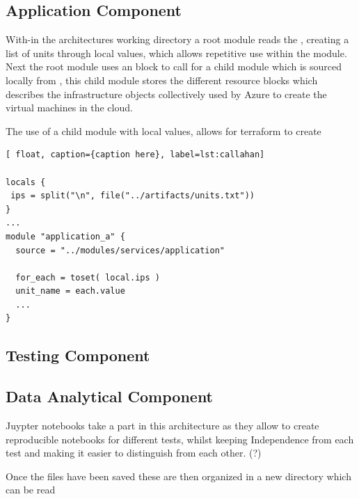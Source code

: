\subsection{Application Component}
With-in the architectures working directory a root module  reads the , creating a list of units through local values, which allows repetitive use within the module. Next the root module uses an  block to call for a child module which is sourced locally from , this child module stores the different resource blocks which describes the infrastructure objects collectively used by Azure to create the virtual machines in the cloud. 

The use of a child module with local values, allows for terraform to create 

\begin{lstlisting}[ float, caption={caption here}, label=lst:callahan]
  
locals {
 ips = split("\n", file("../artifacts/units.txt"))
}
...
module "application_a" {
  source = "../modules/services/application"

  for_each = toset( local.ips )
  unit_name = each.value
  ...
}

\end{lstlisting}

\subsection{Testing Component}

\subsection{Data Analytical Component}
Juypter notebooks take a part in this architecture as they allow to create reproducible notebooks for different tests, whilst keeping Independence from each test and making it easier to distinguish from each other. (?)

Once the files have been saved these are then organized in a new directory which can be read




